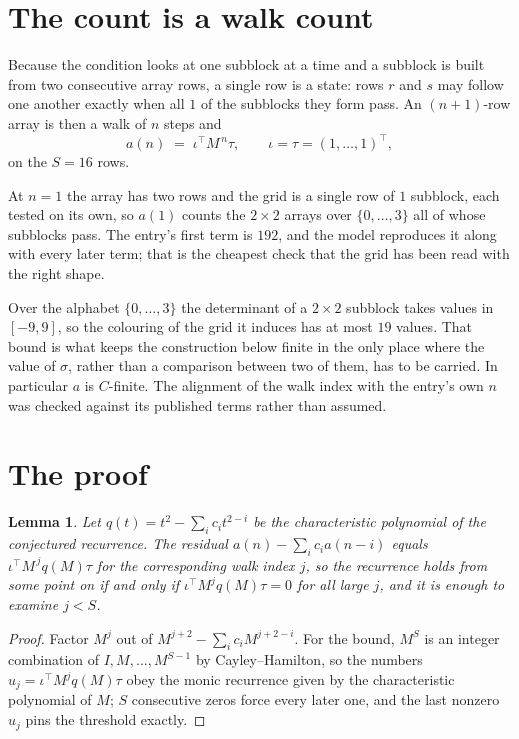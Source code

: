 \documentclass[11pt,a4paper]{article}
\theoremstyle{plain}
\newtheorem{lemma}[theorem]{Lemma}
\theoremstyle{definition}
\begin{document}
\section{The count is a walk count}

Because the condition looks at one subblock at a time and a subblock is
built from two consecutive array rows, a single row is a state: rows $r$ and $s$ may follow one
another exactly when all $1$ of the subblocks they form pass. An $(n+1)$-row array is then a
walk of $n$ steps and
\[
a(n)\;=\;\iota^{\!\top}M^{\,n}\tau,\qquad\iota=\tau=(1,\dots,1)^{\!\top},
\]
on the $S=16$ rows.

At $n=1$ the array has two rows and the grid is a single row of $1$
subblock, each tested on its own, so $a(1)$ counts the
$2\times2$ arrays over $\{0,\dots,3\}$ all of whose subblocks pass. The entry's
first term is $192$, and the model reproduces it along with every later term; that is the
cheapest check that the grid has been read with the right shape.

Over the alphabet $\{0,\dots,3\}$ the determinant of a $2\times2$ subblock takes values in
$[-9,9]$, so the colouring of the grid it induces has at most $19$ values.
That bound is what keeps the construction below finite in the only place where the value of
$\sigma$, rather than a comparison between two of them, has to be carried.
In particular $a$ is $C$-finite. The alignment of the walk index with the entry's own $n$ was
checked against its published terms rather than assumed.

\section{The proof}

\begin{lemma}\label{lem:crit}
Let $q(t)=t^{2}-\sum_i c_it^{2-i}$ be the characteristic polynomial of the
conjectured recurrence. The residual $a(n)-\sum_ic_ia(n-i)$ equals
$\iota^{\!\top}M^{\,j}q(M)\tau$ for the corresponding walk index $j$, so the recurrence
holds from some point on if and only if $\iota^{\!\top}M^{j}q(M)\tau=0$ for all large $j$,
and it is enough to examine $j<S$.
\end{lemma}

\begin{proof}
Factor $M^{j}$ out of $M^{j+2}-\sum_ic_iM^{j+2-i}$. For the bound, $M^{S}$
is an integer combination of $I,M,\dots,M^{S-1}$ by Cayley--Hamilton, so the numbers
$u_j=\iota^{\!\top}M^{j}q(M)\tau$ obey the monic recurrence given by the characteristic
polynomial of $M$; $S$ consecutive zeros force every later one, and the last nonzero $u_j$
pins the threshold exactly.
\end{proof}
\end{document}
